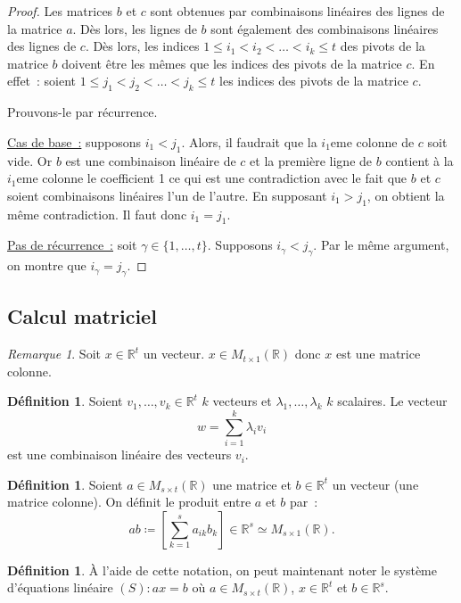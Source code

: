 \documentclass{article}
\newcommand{\R}{\mathbb R}
\newcommand{\M}[3]{M_{#1 \times #2}(#3)}
\theoremstyle{definition}
\newtheorem{déf}[thm]{Définition}
\theoremstyle{remark}
\newtheorem*{rmq}{Remarque}
\begin{document}
		\begin{proof} Les matrices $b$ et $c$ sont obtenues par combinaisons linéaires des lignes de la matrice $a$. Dès lors, les lignes de $b$ sont également des
		combinaisons linéaires des lignes de $c$. Dès lors, les indices $1 \leq i_1 < i_2 < \ldots < i_k \leq t$ des pivots de la matrice $b$ doivent être les mêmes que
		les indices des pivots de la matrice $c$. En effet~: soient $1 \leq j_1 < j_2 < \ldots <  j_k \leq t$ les indices des pivots de la matrice $c$.

		Prouvons-le par récurrence. 

		\underline{Cas de base~:} supposons $i_1 < j_1$. Alors, il faudrait que la $i_1$eme colonne de $c$ soit vide. Or $b$ est une combinaison linéaire de $c$ et la
		première ligne de $b$ contient à la $i_1$eme colonne le coefficient 1 ce qui est une contradiction avec le fait que $b$ et $c$ soient combinaisons linéaires
		l'un de l'autre. En supposant $i_1 > j_1$, on obtient la même contradiction. Il faut donc $i_1 = j_1$.

		\underline{Pas de récurrence~:} soit $\gamma \in \{1, \dotsc, t\}$. Supposons $i_\gamma < j_\gamma$. Par le même argument, on montre que $i_\gamma = j_\gamma$.
		\end{proof}

	\subsection{Calcul matriciel}
		\begin{rmq} Soit $x \in \R^t$ un vecteur. $x \in \M t1\R$ donc $x$ est une matrice colonne. \end{rmq}

		\begin{déf} Soient $v_1, \dotsc, v_k \in \R^t$ $k$ vecteurs et $\lambda_1, \dotsc, \lambda_k$ $k$ scalaires. Le vecteur \[w = \sum_{i=1}^k\lambda_iv_i\]
		est une combinaison linéaire des vecteurs $v_i$. \end{déf}

		\begin{déf} Soient $a \in \M st\R$ une matrice et $b \in \R^t$ un vecteur (une matrice colonne). On définit le produit entre $a$ et $b$ par~:
		\[ab \coloneqq \left[\sum_{k=1}^sa_{ik}b_k\right] \in \R^s \simeq \M s1\R.\] \end{déf}

		\begin{déf} À l'aide de cette notation, on peut maintenant noter le système d'équations linéaire $(S) : ax = b$ où $a \in \M st\R$, $x \in \R^t$ et $b \in \R^s$.
		\end{déf}
\end{document}
